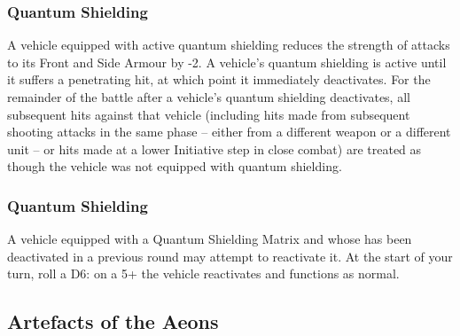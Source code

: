 \subsubsection{Quantum Shielding} \label{Quantum Shielding}

A vehicle equipped with active quantum shielding reduces the strength of attacks to its Front and Side Armour by -2. A vehicle’s quantum shielding is active until it suffers a penetrating hit, at which point it immediately
deactivates. For the remainder of the battle after a vehicle’s quantum shielding deactivates, all subsequent hits against that vehicle (including hits made from subsequent shooting attacks in the same phase – either
from a different weapon or a different unit – or hits made at a lower Initiative step in close combat) are treated as though the vehicle was not equipped with quantum shielding.

\subsubsection{Quantum Shielding} \label{Quantum Shielding Matrix}

A vehicle equipped with a Quantum Shielding Matrix and  whose  has been deactivated in a previous round may attempt to reactivate it. At the start of your turn, roll a D6: on a 5+ the vehicle  reactivates and functions as normal.

\subsection{Artefacts of the Aeons} \label{Artefacts of the Aeons}

